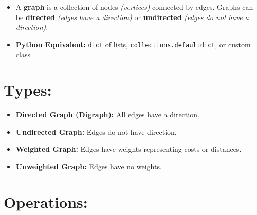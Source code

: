 \documentclass[
  letterpaper,
  DIV=11,
  numbers=noendperiod]{scrreprt}
\providecommand{\tightlist}{%
  \setlength{\itemsep}{0pt}\setlength{\parskip}{0pt}}
\begin{document}
\begin{itemize}
\tightlist
\item
  A \textbf{graph} is a collection of nodes \emph{(vertices)} connected
  by edges. Graphs can be \textbf{directed} \emph{(edges have a
  direction)} or \textbf{undirected} \emph{(edges do not have a
  direction)}.
\item
  \textbf{Python Equivalent:} \texttt{dict} of lists,
  \texttt{collections.defaultdict}, or custom class
\end{itemize}

\section{Types:}

\begin{itemize}
\tightlist
\item
  \textbf{Directed Graph (Digraph):} All edges have a direction.
\item
  \textbf{Undirected Graph:} Edges do not have direction.
\item
  \textbf{Weighted Graph:} Edges have weights representing costs or
  distances.
\item
  \textbf{Unweighted Graph:} Edges have no weights.
\end{itemize}

\section{Operations:}
\end{document}
